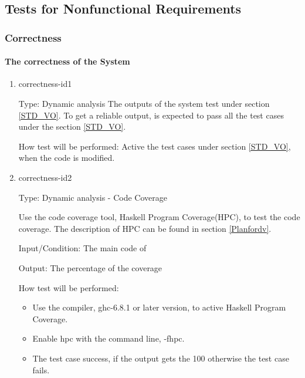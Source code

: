\documentclass[12pt, titlepage]{article}
\begin{document}
\subsection{Tests for Nonfunctional Requirements}

  \subsubsection{Correctness}
\paragraph{The correctness of the System}

\begin{enumerate} 

\item{correctness-id1\\} 

Type: Dynamic analysis
The outputs of the system test under section \ref{STD_VO}. To get a
reliable output, \progname is expected to pass all the test cases under the
section \ref{STD_VO}.

How test will be performed: Active the test cases under section
\ref{STD_VO}, when the code is modified.

\item{correctness-id2\\}

Type: Dynamic analysis - Code Coverage

Use the code coverage tool, Haskell Program Coverage(HPC), to test the code
coverage. The description of HPC can be found in section \ref{Planfordv}.

Input/Condition: The main code of \progname

Output: The percentage of the coverage 

How test will be performed:

\begin{itemize} 
\item Use the compiler, ghc-6.8.1 or later version, to active Haskell Program
Coverage.
\item Enable hpc with the command line, -fhpc.
\item The test case success, if the output gets the 100%
otherwise
the test case fails. 
\end{itemize}
\end{enumerate} 
\end{document}
